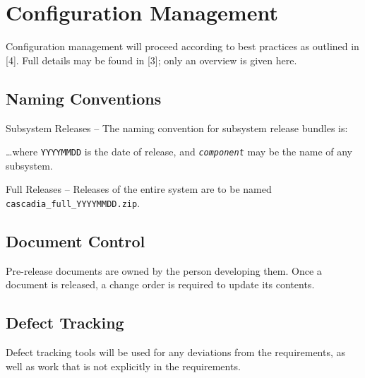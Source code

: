 \documentclass[11pt]{wacomepd}
\begin{document}
\chapter{Configuration Management}

Configuration management will proceed according to best practices as outlined in [4].  Full details
may be found in [3]; only an overview is given here.

\section{Naming Conventions}
{\sc Subsystem Releases} -- The naming convention for subsystem release bundles is:


\ldots where {\tt YYYYMMDD} is the date of release, and {\tt \textit{component}} may be the name of
any subsystem.

{\sc Full Releases} -- Releases of the entire system are to be named
\texttt{cascadia\_full\_YYYYMMDD.zip}.


\section{Document Control}
Pre-release documents are owned by the person developing them.  Once a document is released, a
change order is required to update its contents.


\section{Defect Tracking}
Defect tracking tools will be used for any deviations from the requirements, as well as work that is
not explicitly in the requirements.


\end{document}
